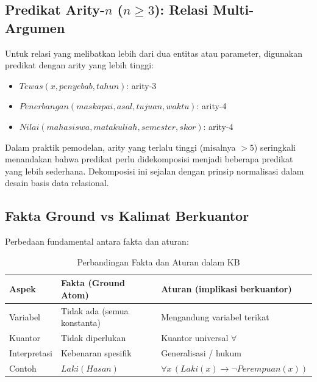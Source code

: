 \subsection{Predikat Arity-$n$ ($n \geq 3$): Relasi Multi-Argumen}

Untuk relasi yang melibatkan lebih dari dua entitas atau parameter, digunakan predikat dengan arity yang lebih tinggi:

\begin{itemize}
    \item $Tewas(x, penyebab, tahun)$: arity-3
    \item $Penerbangan(maskapai, asal, tujuan, waktu)$: arity-4
    \item $Nilai(mahasiswa, matakuliah, semester, skor)$: arity-4
\end{itemize}

\begin{catatan}
Dalam praktik pemodelan, arity yang terlalu tinggi (misalnya $> 5$) seringkali menandakan bahwa predikat perlu didekomposisi menjadi beberapa predikat yang lebih sederhana. Dekomposisi ini sejalan dengan prinsip normalisasi dalam desain basis data relasional.
\end{catatan}

\subsection{Fakta Ground vs Kalimat Berkuantor}

Perbedaan fundamental antara fakta dan aturan:

\begin{table}[H]
\centering
\renewcommand{\arraystretch}{1.3}
\begin{tabular}{|p{3.5cm}|p{4cm}|p{4.5cm}|}
\hline
\textbf{Aspek} & \textbf{Fakta (Ground Atom)} & \textbf{Aturan (implikasi berkuantor)} \\ \hline
Variabel & Tidak ada (semua konstanta) & Mengandung variabel terikat \\ \hline
Kuantor & Tidak diperlukan & Kuantor universal $\forall$ \\ \hline
Interpretasi & Kebenaran spesifik & Generalisasi / hukum \\ \hline
Contoh & $Laki(Hasan)$ & $\forall x\,(Laki(x) \rightarrow \neg Perempuan(x))$ \\ \hline
\end{tabular}
\caption{Perbandingan Fakta dan Aturan dalam KB}
\end{table}

